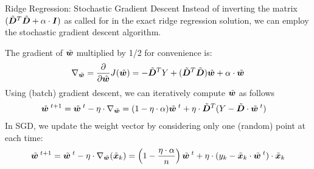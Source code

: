 \begin{frame}{Ridge Regression: Stochastic Gradient Descent}
%
Instead of inverting the matrix $(\abD^T\abD + \alpha \cdot \bI)$ as
called for in the exact ridge regression solution, %
we can employ the stochastic
gradient descent algorithm.

\medskip

The gradient of $\abw$
multiplied by 1/2 for convenience is:
\begin{align*}
    \grad_{\abw} = \frac{\partial}{\partial \abw} J(\abw) = 
     -\abD^T Y + (\abD^T\abD) \abw + \alpha \cdot \abw
\end{align*}
Using (batch) gradient descent, we can iteratively compute $\abw$ as follows
\begin{align*}
    \abw^{\;t+1}  &= \abw^{\;t} - \eta \cdot \grad_{\abw}
    = (1 - \eta \cdot \alpha) \abw^{\;t} + \eta \cdot \abD^T(Y - \abD
    \cdot \abw^{\;t})
\end{align*}
%
In SGD, we update the weight vector by
considering only one (random) point at each time: 
\begin{align*}
    \abw^{\;t+1}  = \abw^{\;t} - \eta \cdot \grad_{\abw}(\abx_k)
     = \lB(1 - \frac{\eta \cdot \alpha}{n}\rB) \abw^{\;t} 
    + \eta \cdot (y_k - \abx_k \cdot \abw^{\;t}) \cdot
    \abx_k
\end{align*}
\end{frame}
%
